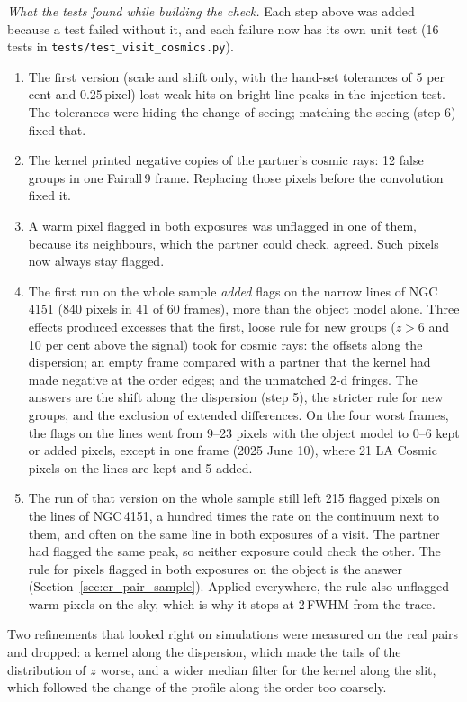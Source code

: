 \textit{What the tests found while building the check.} Each step above was added because a test failed without it,
and each failure now has its own unit test (16 tests in \texttt{tests/test\_visit\_cosmics.py}).
\begin{enumerate}
\item[(i)] The first version (scale and shift only, with the hand-set tolerances of 5 per cent and 0.25\,pixel) lost
weak hits on bright line peaks in the injection test. The tolerances were hiding the change of seeing; matching the
seeing (step 6) fixed that.
\item[(ii)] The kernel printed negative copies of the partner's cosmic rays: 12 false groups in one Fairall\,9 frame.
Replacing those pixels before the convolution fixed it.
\item[(iii)] A warm pixel flagged in both exposures was unflagged in one of them, because its neighbours, which the
partner could check, agreed. Such pixels now always stay flagged.
\item[(iv)] The first run on the whole sample \textit{added} flags on the narrow lines of NGC\,4151 (840 pixels in 41
of 60 frames), more than the object model alone. Three effects produced excesses that the first, loose rule for new
groups ($z>6$ and 10 per cent above the signal) took for cosmic rays: the offsets along the dispersion; an empty frame
compared with a partner that the kernel had made negative at the order edges; and the unmatched 2-d fringes. The
answers are the shift along the dispersion (step 5), the stricter rule for new groups, and the exclusion of extended
differences. On the four worst frames, the flags on the lines went from 9--23 pixels with the object model to 0--6
kept or added pixels, except in one frame (2025 June 10), where 21 LA Cosmic pixels on the lines are kept and 5 added.
\item[(v)] The run of that version on the whole sample still left 215 flagged pixels on the lines of NGC\,4151, a
hundred times the rate on the continuum next to them, and often on the same line in both exposures of a visit. The
partner had flagged the same peak, so neither exposure could check the other. The rule for pixels flagged in both
exposures on the object is the answer (Section~\ref{sec:cr_pair_sample}). Applied everywhere, the rule also unflagged
warm pixels on the sky, which is why it stops at 2\,FWHM from the trace.
\end{enumerate}
Two refinements that looked right on simulations were measured on the real pairs and dropped: a kernel along the
dispersion, which made the tails of the distribution of $z$ worse, and a wider median filter for the kernel along the
slit, which followed the change of the profile along the order too coarsely.

